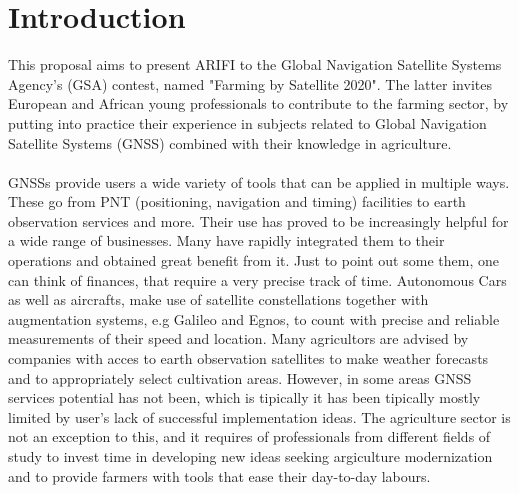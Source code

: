 \section{Introduction}
This proposal aims to present ARIFI to the Global Navigation Satellite Systems Agency's (GSA) contest, named "Farming by Satellite 2020". The latter invites European and African young professionals to contribute to the farming sector, by putting into practice their experience in subjects related to Global Navigation Satellite Systems (GNSS) combined with their knowledge in agriculture.\\\\%
%
%
GNSSs provide users a wide variety of tools that can be applied in multiple ways. These go from PNT (positioning, navigation and timing) facilities to earth observation services and more.
%
Their use has proved to be increasingly helpful for a wide range of businesses. Many have rapidly integrated them to their operations and obtained great benefit from it.
% 
Just to point out some them, one can think of finances, that require a very precise track of time. Autonomous Cars as well as aircrafts, make use of satellite constellations together with augmentation systems, e.g Galileo and Egnos, to count with precise and reliable measurements of their speed and location. Many agricultors are advised by companies with acces to earth observation satellites to make weather forecasts and to appropriately select cultivation areas.
%
However, in some areas GNSS services potential has not been, which is tipically it has been  tipically mostly limited by user's lack of successful implementation ideas. 
%
The agriculture sector is not an exception to this, and it requires of professionals from different fields of study to invest time in developing new ideas seeking argiculture modernization and to provide farmers with tools that ease their day-to-day labours.

